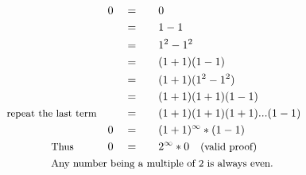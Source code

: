 \begin{alignat*}{5}
&\,&0\quad&=\quad&&0\\
&\,&\,&=&&1-1\\
&\,&\,&=&&1^2-1^2\\
&\,&\,&=&&(1+1)(1-1)\\
&\,&\,&=&&(1+1)(1^2-1^2)\\
&\,&\,&=&&(1+1)(1+1)(1-1)\\
&\small\text{repeat the last term}&\,&=&&(1+1)(1+1)(1+1)...(1-1)\\
&\,&0\quad&=&&(1+1)^\infty*(1-1)\\
&\qquad\qquad\small\text{Thus}\normalsize\quad&0\quad&=&&2^\infty*0\quad\small\text{(valid proof)}\\
&\rlap{\qquad\qquad\small\text{Any number being a multiple of 2 is always even.}}
\end{alignat*}
